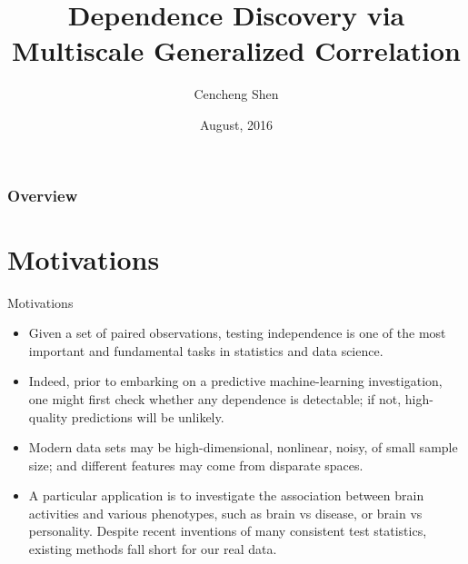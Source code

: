 \documentclass{beamer}
\title[JSM2016]{Dependence Discovery via Multiscale Generalized Correlation}
\author{Cencheng Shen} %
\institute[] %
{
\textit{Joint Work with Joshua T. Vogelstein \& Mauro Maggioni \& Carey E. Priebe} \\
}
\date{August, 2016} %
\begin{document}

\begin{frame}
\titlepage %
\end{frame}

\begin{frame}
\frametitle{Overview} %
\tableofcontents %
\end{frame}

\section{Motivations}
\begin{frame}{Motivations}
\begin{itemize}[<+->]
\item Given a set of paired observations, testing independence is one of the most important and fundamental tasks in statistics and data science.
\item Indeed, prior to embarking on a predictive machine-learning investigation, one might first check whether any dependence is detectable; if not, high-quality predictions will be unlikely.
\item Modern data sets may be high-dimensional, nonlinear, noisy, of small sample size; and different features may come from disparate spaces.
\item A particular application is to investigate the association between brain activities and various phenotypes, such as brain vs disease, or brain vs personality. Despite recent inventions of many consistent test statistics, existing methods fall short for our real data. 
\end{itemize}
\end{frame}
\end{document}
